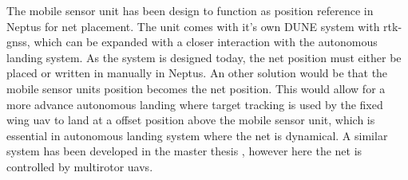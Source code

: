 The mobile sensor unit has been design to function as position reference in Neptus for net placement. The unit comes with it's own DUNE system with \gls{rtk-gnss}, which can be expanded with a closer interaction with the autonomous landing system. As the system is designed today, the net position must either be placed or written in manually in Neptus. An other solution would be that the mobile sensor units position becomes the net position. This would allow for a more advance autonomous landing where target tracking is used by the fixed wing \gls{uav} to land at a offset position above the mobile sensor unit, which is essential in autonomous landing system where the net is dynamical. A similar system has been developed in the master thesis \citep{Jostein}, however here the net is controlled by multirotor \glspl{uav}.

